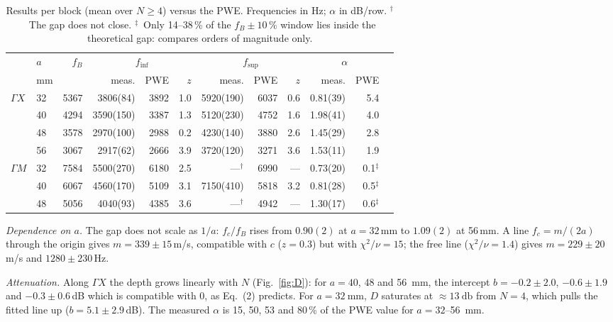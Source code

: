 \documentclass[9pt,a4paper,twocolumn]{extarticle}
\newcommand{\umm}{\milli\metre}
\newcommand{\udB}{\decibel}
\newcommand{\GX}{\ensuremath{\Gamma X}}
\newcommand{\GM}{\ensuremath{\Gamma M}}
\newcommand{\finf}{\ensuremath{f_{\mathrm{inf}}}}
\newcommand{\fsup}{\ensuremath{f_{\mathrm{sup}}}}
\begin{document}
\begin{table}[t]
\centering
\caption{Results per block (mean over $N\ge4$) versus the PWE. Frequencies in Hz; $\alpha$ in dB/row. $^\dagger$~The gap does not close. $^\ddagger$~Only 14--38\,\% of the $f_B\pm10\,\%$ window lies inside the theoretical gap: compares orders of magnitude only.}
\label{tab:main}
\scriptsize
\setlength{\tabcolsep}{2.6pt}
\begin{tabular}{@{}llrrrrrrrrrr@{}}
\toprule
 & $a$ & $f_B$ & \multicolumn{3}{c}{\finf} & \multicolumn{3}{c}{\fsup} & \multicolumn{2}{c}{$\alpha$}\\
 \cmidrule(lr){4-6}\cmidrule(lr){7-9}\cmidrule(l){10-11}
 & mm & & meas. & PWE & $z$ & meas. & PWE & $z$ & meas. & PWE\\
\midrule
\GX & 32 & 5367 & 3806(84)  & 3892 & 1.0 & 5920(190) & 6037 & 0.6 & 0.81(39) & 5.4\\
    & 40 & 4294 & 3590(150) & 3387 & 1.3 & 5120(230) & 4752 & 1.6 & 1.98(41) & 4.0\\
    & 48 & 3578 & 2970(100) & 2988 & 0.2 & 4230(140) & 3880 & 2.6 & 1.45(29) & 2.8\\
    & 56 & 3067 & 2917(62)  & 2666 & 3.9 & 3720(120) & 3271 & 3.6 & 1.53(11) & 1.9\\
\midrule
\GM & 32 & 7584 & 5500(270) & 6180 & 2.5 & ---$^\dagger$ & 6990 & --- & 0.73(20) & 0.1$^\ddagger$\\
    & 40 & 6067 & 4560(170) & 5109 & 3.1 & 7150(410) & 5818 & 3.2 & 0.81(28) & 0.5$^\ddagger$\\
    & 48 & 5056 & 4040(93)  & 4385 & 3.6 & ---$^\dagger$ & 4942 & --- & 1.30(17) & 0.6$^\ddagger$\\
\bottomrule
\end{tabular}
\end{table}

\emph{Dependence on $a$.} The gap does not scale as $1/a$: $f_c/f_B$ rises from $0.90(2)$ at
$a=32$\,mm to $1.09(2)$ at 56\,mm. A line $f_c=m/(2a)$ through the origin gives
$m=339\pm15$\,m/s, compatible with $c$ ($z=0.3$) but with
$\chi^2/\nu=15$; the free line ($\chi^2/\nu=1.4$) gives $m=229\pm20$\,m/s and $1280\pm230$\,Hz.

\emph{Attenuation.} Along \GX{} the depth grows linearly with $N$ (Fig.~\ref{fig:D}): for $a=40$, 48
and \SI{56}{\umm}, the intercept $b=-0.2\pm2.0$, $-0.6\pm1.9$ and
$-0.3\pm0.6$\,dB which is compatible with 0, as Eq.~(2) predicts. For $a=\SI{32}{\umm}$, $D$ saturates at $\approx\SI{13}{\udB}$ from $N=4$,
which pulls the fitted line up ($b=5.1\pm2.9$\,dB). The measured $\alpha$ is 15, 50, 53 and 80\,\% of the
PWE value for $a=32$--\SI{56}{\umm}.
\end{document}

